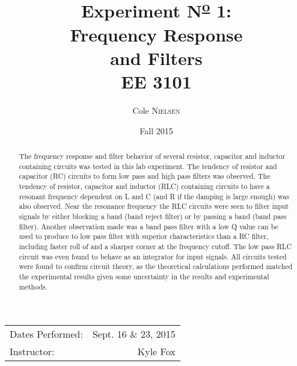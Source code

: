 \documentclass[12pt]{article}
\title{Experiment N\textsuperscript{\underline{o}} 1:   \\ Frequency Response \\and Filters\\ \vspace{0.3 in} EE 3101}
\author{Cole \textsc{Nielsen}}
\date{Fall 2015}
\begin{document}
\maketitle 

\begin{center}
 \begin{tabular}{l r}
   Dates Performed: & Sept. 16 \& 23, 2015 \\ 
   Instructor: & Kyle Fox \\ 
\end{tabular}
\end{center}
\pagebreak
\begin{abstract}
\noindent The frequency response and filter behavior of several resistor, capacitor and inductor containing circuits was tested in this lab experiment. The tendency of resistor and capacitor (RC) circuits to form low pass and high pass filters was observed. The tendency of resistor, capacitor and inductor (RLC) containing circuits to have a resonant frequency  dependent on L and C (and R if the damping is large enough) was also observed. Near the resonance frequency the RLC circuits were seen to filter input signals by either blocking a band (band reject filter) or by passing a band (band pass filter). Another observation made was a band pass filter with a low Q value can be used to produce to low pass filter with superior characteristics than a RC filter, including faster roll of and a sharper corner at the frequency cutoff. The low pass RLC circuit was even found to behave as an integrator for input signals. All circuits tested were found to confirm circuit theory, as the theoretical calculations performed matched the experimental results given some uncertainty in the results and experimental methods.
\end{abstract}
\hrulefill
\end{document}
